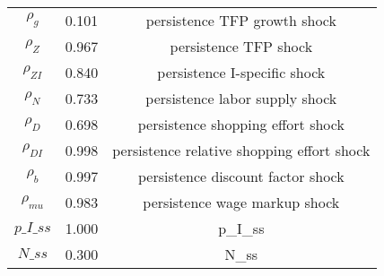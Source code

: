 \begin{center}
\begin{longtable}{ccc}
${\rho_g}$ 	 & 	 0.101 	 & 	 persistence TFP growth shock\\
${\rho_Z}$ 	 & 	 0.967 	 & 	 persistence TFP shock\\
${\rho_{ZI}}$ 	 & 	 0.840 	 & 	 persistence I-specific shock\\
${\rho_N}$ 	 & 	 0.733 	 & 	 persistence labor supply shock\\
${\rho_D}$ 	 & 	 0.698 	 & 	 persistence shopping effort shock\\
${\rho_{DI}}$ 	 & 	 0.998 	 & 	 persistence relative shopping effort shock\\
${\rho_b}$ 	 & 	 0.997 	 & 	 persistence discount factor shock\\
${\rho_{mu}}$ 	 & 	 0.983 	 & 	 persistence wage markup shock\\
$p\_I\_ss$ 	 & 	 1.000 	 & 	 p\_I\_ss\\
$N\_ss$ 	 & 	 0.300 	 & 	 N\_ss\\
\bottomrule%
\end{longtable}
\end{center}
